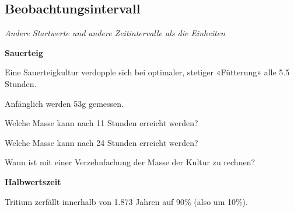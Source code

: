 
\subsection{Beobachtungsintervall}
\textit{Andere Startwerte und andere Zeitintervalle als die Einheiten}



\bbwActAufgabenNr{} \textbf{Sauerteig}

Eine Sauerteigkultur verdopple sich bei optimaler, stetiger «Fütterung» alle 5.5 Stunden.

Anfänglich werden 53g gemessen.

\begin{bbwAufgabenBlock}

\item Welche Masse kann nach 11 Stunden erreicht werden?

\item Welche Masse kann nach 24 Stunden erreicht werden?

\item Wann ist mit einer Verzehnfachung der Masse der Kultur zu rechnen?


\end{bbwAufgabenBlock}
\platzFuerBerechnungenBisEndeSeite{}



\bbwActAufgabenNr{} \textbf{Halbwertszeit}

Tritium zerfällt innerhalb von 1.873 Jahren auf 90\%  (also um 10\%).


